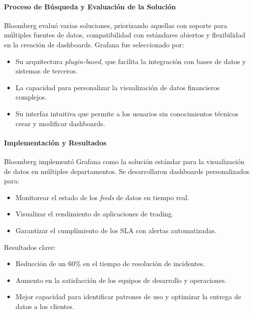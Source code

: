 {                \paragraph{Proceso de Búsqueda y Evaluación de la Solución}  
                Bloomberg evaluó varias soluciones, priorizando aquellas con soporte para múltiples fuentes de datos, compatibilidad con estándares abiertos y flexibilidad en la creación de dashboards. Grafana fue seleccionado por:
                \begin{itemize}
                    \item Su arquitectura \textit{plugin-based}, que facilita la integración con bases de datos y sistemas de terceros.
                    \item La capacidad para personalizar la visualización de datos financieros complejos.
                    \item Su interfaz intuitiva que permite a los usuarios sin conocimientos técnicos crear y modificar dashboards.
                \end{itemize}
                
                \paragraph{Implementación y Resultados}  
                Bloomberg implementó Grafana como la solución estándar para la visualización de datos en múltiples departamentos. Se desarrollaron dashboards personalizados para:
                \begin{itemize}
                    \item Monitorear el estado de los \textit{feeds} de datos en tiempo real.
                    \item Visualizar el rendimiento de aplicaciones de trading.
                    \item Garantizar el cumplimiento de los SLA con alertas automatizadas.
                \end{itemize}
                
                Resultados clave:
                \begin{itemize}
                    \item Reducción de un 60\% en el tiempo de resolución de incidentes.
                    \item Aumento en la satisfacción de los equipos de desarrollo y operaciones.
                    \item Mejor capacidad para identificar patrones de uso y optimizar la entrega de datos a los clientes.
                \end{itemize}
                
}
